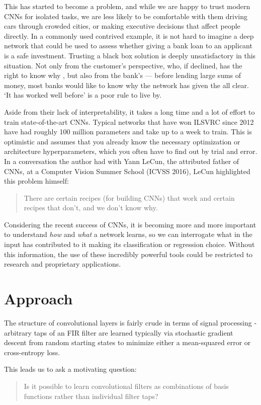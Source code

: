This has started to become a problem, and while we are happy to trust modern
CNNs for isolated tasks, we are less likely to be comfortable with them driving
cars through crowded cities, or making executive decisions that affect people
directly. In a commonly used contrived example, it is not hard to imagine a deep
network that could be used to assess whether giving a bank loan to an applicant
is a safe investment. Trusting a black box solution is deeply unsatisfactory in
this situation. Not only from the customer's perspective, who, if declined, has
the right to know why \cite{goodman_european_2016}, but
also from the bank's --- before lending large sums of money, most banks
would like to know why the network has given the all clear. `It has worked well
before' is a poor rule to live by.

Aside from their lack of interpretability, it takes a long time and a lot of
effort to train state-of-the-art CNNs. Typical networks that have won ILSVRC
since 2012 have had roughly 100 million parameters and take up to a week to train. This 
is optimistic and assumes that you already know the necessary optimization or
architecture hyperparameters, which you often have to find out by trial and error. 
In a conversation the author had with Yann LeCun, the attributed father of
CNNs, at a Computer Vision Summer School (ICVSS 2016), LeCun highlighted this problem
himself:
\begin{quote}
  There are certain recipes (for building CNNs) that work and certain recipes
  that don't, and we don't know why.
\end{quote}

Considering the recent success of CNNs, it is becoming more and more
important to understand \emph{how} and \emph{what} a network learns, so we can 
interrogate what in the input has contributed to it making its classification or regression choice.
Without this information, the use of these incredibly powerful tools could be
restricted to research and proprietary applications.

\section{Approach}
The structure of convolutional layers is fairly crude in terms of signal
processing - arbitrary taps of an FIR filter are learned typically via
stochastic gradient descent from random starting states to minimize either a
mean-squared error or cross-entropy loss. 

This leads us to ask a motivating question:
%
\begin{quote}
  Is it possible to learn convolutional filters as combinations of basis
  functions rather than individual filter taps?
\end{quote}


